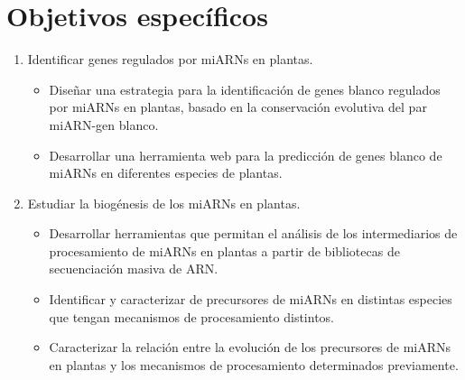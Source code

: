 \section{Objetivos específicos}

\begin{enumerate}
    \item Identificar genes regulados por miARNs en plantas.
    \begin{itemize}
        \item Diseñar una estrategia para la identificación de genes blanco regulados por miARNs en plantas, basado en la conservación evolutiva del par miARN-gen blanco.
        \item Desarrollar una herramienta web para la predicción de genes blanco de miARNs en diferentes especies de plantas.		
    \end{itemize}
    \item Estudiar la biogénesis de los miARNs en plantas.
    \begin{itemize}
        \item Desarrollar herramientas que permitan el análisis de los intermediarios de procesamiento de miARNs en plantas a partir de bibliotecas de secuenciación masiva de ARN.
		\item Identificar y caracterizar de precursores de miARNs en distintas especies que tengan mecanismos de procesamiento distintos.
        \item Caracterizar la relación entre la evolución de los precursores de miARNs en plantas y los mecanismos de procesamiento determinados previamente.
    \end{itemize}
\end{enumerate}
